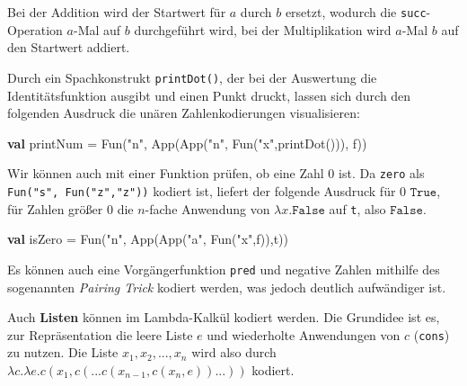 \documentclass[]{article}
\newenvironment{Shaded}{}{}
\newcommand{\FunctionTok}[1]{\textcolor[rgb]{0.02,0.16,0.49}{#1}}
\newcommand{\KeywordTok}[1]{\textcolor[rgb]{0.00,0.44,0.13}{\textbf{#1}}}
\newcommand{\NormalTok}[1]{#1}
\newcommand{\StringTok}[1]{\textcolor[rgb]{0.25,0.44,0.63}{#1}}
\begin{document}
Bei der Addition wird der Startwert für \(a\) durch \(b\) ersetzt,
wodurch die \texttt{succ}-Operation \(a\)-Mal auf \(b\) durchgeführt
wird, bei der Multiplikation wird \(a\)-Mal \(b\) auf den Startwert
addiert.

Durch ein Spachkonstrukt \texttt{printDot()}, der bei der Auswertung die
Identitätsfunktion ausgibt und einen Punkt druckt, lassen sich durch den
folgenden Ausdruck die unären Zahlenkodierungen visualisieren:

\begin{Shaded}
\begin{Highlighting}[]
\KeywordTok{val}\NormalTok{ printNum = }\FunctionTok{Fun}\NormalTok{(}\StringTok{"n"}\NormalTok{, }\FunctionTok{App}\NormalTok{(}\FunctionTok{App}\NormalTok{(}\StringTok{"n"}\NormalTok{, }\FunctionTok{Fun}\NormalTok{(}\StringTok{"x"}\NormalTok{,}\FunctionTok{printDot}\NormalTok{())), f))}
\end{Highlighting}
\end{Shaded}

Wir können auch mit einer Funktion prüfen, ob eine Zahl 0 ist. Da
\texttt{zero} als \texttt{Fun("s",\ Fun("z","z"))} kodiert ist, liefert
der folgende Ausdruck für 0 \(\texttt{True}\), für Zahlen größer 0 die
\(n\)-fache Anwendung von \(\lambda x.\texttt{False}\) auf \texttt{t},
also \(\texttt{False}\).

\begin{Shaded}
\begin{Highlighting}[]
\KeywordTok{val}\NormalTok{ isZero = }\FunctionTok{Fun}\NormalTok{(}\StringTok{"n"}\NormalTok{, }\FunctionTok{App}\NormalTok{(}\FunctionTok{App}\NormalTok{(}\StringTok{"a"}\NormalTok{, }\FunctionTok{Fun}\NormalTok{(}\StringTok{"x"}\NormalTok{,f)),t))}
\end{Highlighting}
\end{Shaded}

Es können auch eine Vorgängerfunktion \texttt{pred} und negative Zahlen
mithilfe des sogenannten \emph{Pairing Trick} kodiert werden, was jedoch
deutlich aufwändiger ist.

Auch \textbf{Listen} können im Lambda-Kalkül kodiert werden. Die
Grundidee ist es, zur Repräsentation die leere Liste \(e\) und
wiederholte Anwendungen von \(c\) (\texttt{cons}) zu nutzen. Die Liste
\(x_1,x_2,...,x_n\) wird also durch
\(\lambda c. \lambda e. c(x_1, c(... c(x_{n-1}, c(x_n,e))...))\)
kodiert.
\end{document}
